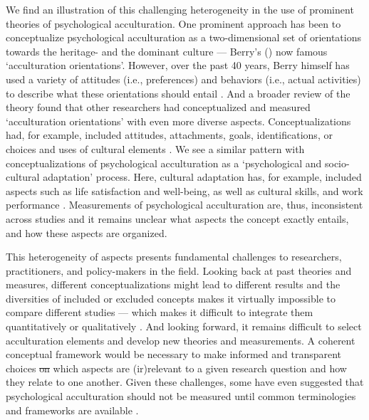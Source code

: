 \documentclass[man, 12pt, a4paper, mask]{apa7}
\providecommand{\DIFaddtex}[1]{{\protect\color{blue}\uwave{#1}}} %
\providecommand{\DIFdeltex}[1]{{\protect\color{red}\sout{#1}}}                      %
\providecommand{\DIFaddbegin}{} %
\providecommand{\DIFaddend}{} %
\providecommand{\DIFdelbegin}{} %
\providecommand{\DIFdelend}{} %
\providecommand{\DIFadd}[1]{\texorpdfstring{\DIFaddtex{#1}}{#1}} %
\providecommand{\DIFdel}[1]{\texorpdfstring{\DIFdeltex{#1}}{}} %
\newcommand{\DIFscaledelfig}{0.5}
\newlength{\DIFdelgraphicswidth} %
\newlength{\DIFdelgraphicsheight} %
\newcommand{\DIFaddincludegraphics}[2][]{{\color{blue}\fbox{\DIFOincludegraphics[#1]{#2}}}} %
\newcommand{\DIFdelincludegraphics}[2][]{%
\sbox{\DIFdelgraphicsbox}{\DIFOincludegraphics[#1]{#2}}%
\settoboxwidth{\DIFdelgraphicswidth}{\DIFdelgraphicsbox} %
\settoboxtotalheight{\DIFdelgraphicsheight}{\DIFdelgraphicsbox} %
\scalebox{\DIFscaledelfig}{%
\parbox[b]{\DIFdelgraphicswidth}{\usebox{\DIFdelgraphicsbox}\\[-\baselineskip] \rule{\DIFdelgraphicswidth}{0em}}\llap{\resizebox{\DIFdelgraphicswidth}{\DIFdelgraphicsheight}{%
\setlength{\unitlength}{\DIFdelgraphicswidth}%
\begin{picture}(1,1)%
\thicklines\linethickness{2pt} %
{\color[rgb]{1,0,0}\put(0,0){\framebox(1,1){}}}%
{\color[rgb]{1,0,0}\put(0,0){\line( 1,1){1}}}%
{\color[rgb]{1,0,0}\put(0,1){\line(1,-1){1}}}%
\end{picture}%
}\hspace*{3pt}}} %
} %
\DeclareRobustCommand{\DIFaddbegin}{\DIFOaddbegin \let\includegraphics\DIFaddincludegraphics} %
\DeclareRobustCommand{\DIFaddend}{\DIFOaddend \let\includegraphics\DIFOincludegraphics} %
\DeclareRobustCommand{\DIFdelbegin}{\DIFOdelbegin \let\includegraphics\DIFdelincludegraphics} %
\DeclareRobustCommand{\DIFdelend}{\DIFOaddend \let\includegraphics\DIFOincludegraphics} %
\begin{document}
We find an illustration of this challenging heterogeneity in the use of prominent theories of psychological acculturation. One prominent approach has been to conceptualize psychological acculturation as a two-dimensional set of orientations towards the heritage- and the dominant culture --- Berry's (\citeyear{Berry1980, Berry1997b, Berry2005}) now famous `acculturation orientations'. However, over the past 40 years, Berry himself has used a variety of attitudes (i.e., preferences) and behaviors (i.e., actual activities) to describe what these orientations should entail \citep{Berry2005}. And a broader review of the theory found that other researchers had conceptualized and measured `acculturation orientations' with even more diverse aspects. Conceptualizations had, for example, included attitudes, attachments, goals, identifications, or choices and uses of cultural elements \citep[e.g., language, food, or dresses. See,][]{Rudmin2003a}. We see a similar pattern with conceptualizations of psychological acculturation as a `psychological and socio-cultural adaptation' process. Here, cultural adaptation has, for example, included aspects such as life satisfaction and well-being, as well as cultural skills, and work performance \citep{Searle1990, Ward2001, Berry2003}.
Measurements of psychological acculturation are, thus, inconsistent across studies and it remains unclear what aspects the concept exactly entails, and how these aspects are organized.

This heterogeneity of aspects presents fundamental challenges to researchers, practitioners, and policy-makers in the field. Looking back at past theories and measures, different conceptualizations might lead to different results \citep{Snauwaert2003} and the diversities of included or excluded concepts makes it virtually impossible to compare different studies --- which makes it difficult to integrate them quantitatively or qualitatively \citep{Taft1981}.
And looking forward, it remains difficult to select acculturation elements and develop new theories and measurements. A coherent conceptual framework would be necessary to make informed and transparent choices \DIFdelbegin \DIFdel{on }\DIFdelend \DIFaddbegin \DIFadd{about }\DIFaddend which aspects are (ir)relevant to a given research question and how they relate to one another.
Given these challenges, some have even suggested that psychological acculturation should not be measured until common terminologies and frameworks are available \citep{Escobar2000}.
\end{document}
